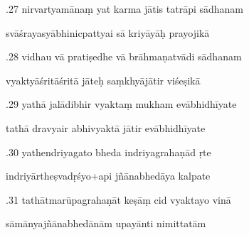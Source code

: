 \documentclass[article,12pt,a4paper]{memoir}%
\newcounter{parCount}
\begin{document}
	  
	  \pstart {}.27 nirvartyamānaṃ yat karma jātis tatrāpi sādhanam 
	{}
	\pend%
      

	  
	  \pstart \leavevmode%
	svāśrayasyābhinicpattyai sā kriyāyāḥ prayojikā 
	{}
	\pend%
      

	  
	  \pstart {}.28 vidhau vā pratiṣedhe vā brāhmaṇatvādi sādhanam 
	{}
	\pend%
      

	  
	  \pstart \leavevmode%
	vyaktyāśritāśritā jāteḥ saṃkhyājātir viśeṣikā 
	{}
	\pend%
      

	  
	  \pstart {}.29 yathā jalādibhir vyaktaṃ mukham evābhidhīyate 
	{}
	\pend%
      

	  
	  \pstart \leavevmode%
	tathā dravyair abhivyaktā jātir evābhidhīyate 
	{}
	\pend%
      

	  
	  \pstart {}.30 yathendriyagato bheda indriyagrahaṇād ṛte 
	{}
	\pend%
      

	  
	  \pstart \leavevmode%
	indriyārtheṣvadṛśyo+api jñānabhedāya kalpate 
	{}
	\pend%
      

	  
	  \pstart {}.31 tathātmarūpagrahaṇāt keṣāṃ cid vyaktayo vinā 
	{}
	\pend%
      

	  
	  \pstart \leavevmode%
	sāmānyajñānabhedānām upayānti nimittatām 
	{}
	\pend%
      
\end{document}
